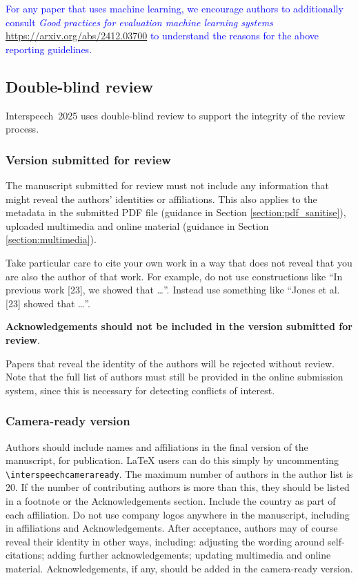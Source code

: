 \documentclass{Interspeech}
\newcommand{\blue}[1]{\textcolor{blue}{#1}}
\begin{document}
\blue{For any paper that uses machine learning, we encourage authors to additionally consult \textit{Good practices for evaluation machine learning systems} \url{https://arxiv.org/abs/2412.03700} to understand the reasons for the above reporting guidelines.} 

\subsection{Double-blind review}
\label{section:doubleblind}

Interspeech~2025 uses double-blind review to support the integrity of the review process. 

\subsubsection{Version submitted for review}

The manuscript submitted for review must not include any information that might reveal the authors' identities or affiliations. This also applies to the metadata in the submitted PDF file (guidance in Section \ref{section:pdf_sanitise}), uploaded multimedia and online material (guidance in Section \ref{section:multimedia}).
 
Take particular care to cite your own work in a way that does not reveal that you are also the author of that work. For example, do not use constructions like ``In previous work [23], we showed that \ldots''. Instead use something like ``Jones et al. [23] showed that \ldots''.

\textbf{Acknowledgements should not be included in the version submitted for review}.

Papers that reveal the identity of the authors will be rejected without review.
Note that the full list of authors must still be provided in the online submission system, since this is necessary for detecting conflicts of interest. 

\subsubsection{Camera-ready version}

Authors should include names and affiliations in the final version of the manuscript, for publication. \LaTeX\xspace users can do this simply by uncommenting  \texttt{\textbackslash interspeechcameraready}. The maximum number of authors in the author list is 20. If the number of contributing authors is more than this, they should be listed in a footnote or the Acknowledgements section. Include the country as part of each affiliation. Do not use company logos anywhere in the manuscript, including in affiliations and Acknowledgements. After acceptance, authors may of course reveal their identity in other ways, including: adjusting the wording around self-citations; adding further acknowledgements; updating multimedia and online material. Acknowledgements, if any, should be added in the camera-ready version.
\end{document}

